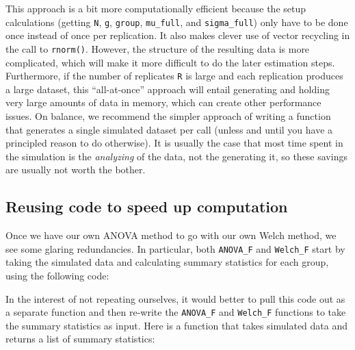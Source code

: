 \documentclass[
]{book}
\newenvironment{Shaded}{\begin{snugshade}}{\end{snugshade}}
\newcommand{\FunctionTok}[1]{\textcolor[rgb]{0.13,0.29,0.53}{\textbf{#1}}}
\newcommand{\NormalTok}[1]{#1}
\newcommand{\OtherTok}[1]{\textcolor[rgb]{0.56,0.35,0.01}{#1}}
\newcommand{\SpecialCharTok}[1]{\textcolor[rgb]{0.81,0.36,0.00}{\textbf{#1}}}
\begin{document}
This approach is a bit more computationally efficient because the setup calculations (getting \texttt{N}, \texttt{g}, \texttt{group}, \texttt{mu\_full}, and \texttt{sigma\_full}) only have to be done once instead of once per replication. It also makes clever use of vector recycling in the call to \texttt{rnorm()}. However, the structure of the resulting data is more complicated, which will make it more difficult to do the later estimation steps.
Furthermore, if the number of replicates \texttt{R} is large and each replication produces a large dataset, this ``all-at-once'' approach will entail generating and holding very large amounts of data in memory, which can create other performance issues.
On balance, we recommend the simpler approach of writing a function that generates a single simulated dataset per call (unless and until you have a principled reason to do otherwise).
It is usually the case that most time spent in the simulation is the \emph{analyzing} of the data, not the generating it, so these savings are usually not worth the bother.

\subsection{Reusing code to speed up computation}\label{reusing-code-to-speed-up-computation}

Once we have our own ANOVA method to go with our own Welch method, we see some glaring redundancies.
In particular, both \texttt{ANOVA\_F} and \texttt{Welch\_F} start by taking the simulated data and calculating summary statistics for each group, using the following code:

\begin{Shaded}
\end{Shaded}

In the interest of not repeating ourselves, it would better to pull this code out as a separate function and then re-write the \texttt{ANOVA\_F} and \texttt{Welch\_F} functions to take the summary statistics as input. Here is a function that takes simulated data and returns a list of summary statistics:
\end{document}
